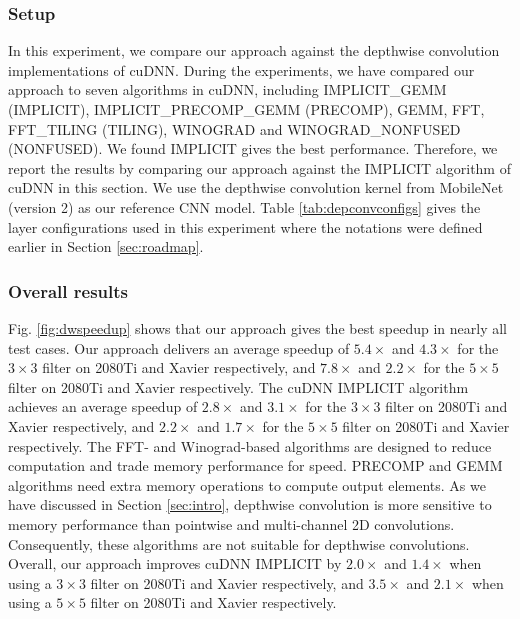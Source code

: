 \subsubsection{Setup} In this experiment, we compare our approach against the depthwise convolution implementations of cuDNN.
During the experiments, we have compared our approach to seven algorithms in cuDNN, including IMPLICIT\_GEMM (IMPLICIT),
IMPLICIT\_PRECOMP\_GEMM (PRECOMP), GEMM, FFT, FFT\_TILING (TILING), WINOGRAD and WINOGRAD\_NONFUSED (NONFUSED). We
found IMPLICIT gives the best performance. Therefore, we report the results by comparing our approach against  the IMPLICIT algorithm of
cuDNN in this section. We use the depthwise convolution kernel from MobileNet (version 2) as our reference CNN model. Table
\ref{tab:depconvconfigs} gives the layer configurations used in this experiment where the notations were defined earlier in Section
\ref{sec:roadmap}.


\subsubsection{Overall results}
 Fig. \ref{fig:dwspeedup} shows that our approach gives the best speedup in nearly all test cases. Our
approach delivers an average speedup of $5.4\times$ and $4.3\times$ for the $3 \times 3$ filter on 2080Ti and Xavier respectively, and
$7.8\times$ and $2.2\times$ for the $5 \times 5$ filter on 2080Ti and Xavier respectively. The cuDNN IMPLICIT algorithm achieves an average
speedup of $2.8\times$ and $3.1\times$ for the $3 \times 3$ filter on 2080Ti and Xavier respectively, and $2.2\times$ and $1.7\times$ for
the $5 \times 5$ filter on 2080Ti and Xavier respectively. %
The FFT- and Winograd-based algorithms are designed to reduce computation and trade memory performance for speed. PRECOMP and GEMM
algorithms need extra memory operations to compute output elements. As we have discussed in Section \ref{sec:intro}, depthwise convolution
is more sensitive to memory performance than pointwise and multi-channel 2D convolutions. Consequently, these algorithms are not suitable
for depthwise convolutions. Overall, our approach improves cuDNN IMPLICIT by $2.0\times$ and $1.4\times$ when using a $3 \times 3$  filter
on 2080Ti and Xavier respectively, and $3.5\times$ and $2.1\times$ when using a $5 \times 5$ filter on 2080Ti and Xavier respectively.

